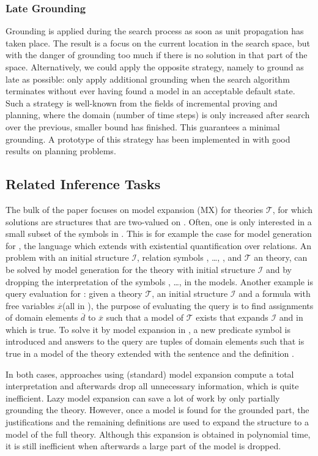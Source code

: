 \documentclass[11pt]{article}
\newcommand{\m}[1]{\ensuremath{#1}\xspace}
\newcommand{\I}{\m{\mathcal{I}}}
\newcommand{\theory}{\m{\mathcal{T}}}
\newcommand{\xxx}{\m{\overline{x}}}
\newcommand{\ddd}{\m{\overline{d}}}
\newcommand{\logicname}[1]{\text{\sc #1}\xspace}
\newcommand{\idp}{\logicname{IDP}}
\newcommand{\foid}{\logicname{FO(\ensuremath{ID})}}
\newcommand{\esoid}{\logicname{\ensuremath{\exists}SO(\ensuremath{ID})}}
\theoremstyle{plain}
\theoremstyle{definition}
\theoremstyle{example_basic}
\theoremstyle{example_contd}
\theoremstyle{plain}
\begin{document}
\subsubsection{Late Grounding} 
Grounding is applied during the search process as soon as unit propagation has taken place. The result is a focus on the current location in the search space, but with the danger of grounding too much if there is no solution in that part of the space. Alternatively, we could apply the opposite strategy, namely to ground as late as possible: only apply additional grounding when the search algorithm terminates without ever having found a model in an acceptable default state. Such a strategy is well-known from the fields of incremental proving and planning, where the domain (number of time steps) is only increased after search over the previous, smaller bound has finished. This guarantees a minimal grounding. A prototype of this strategy has been implemented in \idp with good results on planning problems.

\subsection{Related Inference Tasks}\label{sec:reltasks}
The bulk of the paper focuses on model expansion (MX) for
  \foid theories \theory, for which solutions are structures that are
  two-valued on .  Often, one is only interested in a
  small subset of the symbols in . This is for example
  the case for model generation for \esoid, the language which extends
  \foid with existential quantification over relations. An \esoid
  problem  with an initial
  structure \I, relation symbols , \ldots, , and
  \theory an \foid theory, can be solved by model generation for the
  \foid theory  with initial structure \I and by
  dropping the interpretation of the symbols , \ldots,  in
  the models. Another example is query evaluation for \foid: given a
  theory \theory, an initial structure \I and a formula 
  with free variables \xxx (all in \foid), the purpose of evaluating
  the query  is to find
  assignments of domain elements \ddd  to \xxx such that a model of
  \theory exists that expands \I and in which
   is true. To solve it by model expansion
  in \foid, a new predicate symbol  is introduced and answers to the query
  are tuples of domain elements  such that  is
  true in a model of the theory  extended with the sentence  and the definition .

In both cases, approaches using (standard) model expansion compute a total
  interpretation and afterwards drop all unnecessary information,
  which is quite inefficient. Lazy model expansion can save a lot
  of work by only partially grounding the theory. However, once a
  model is found for the grounded part, the justifications and the
  remaining definitions are used to expand the structure to a model of the
  full theory. Although this expansion is obtained in polynomial time,
  it is still inefficient when afterwards a large part of the model is
  dropped.
\end{document}
